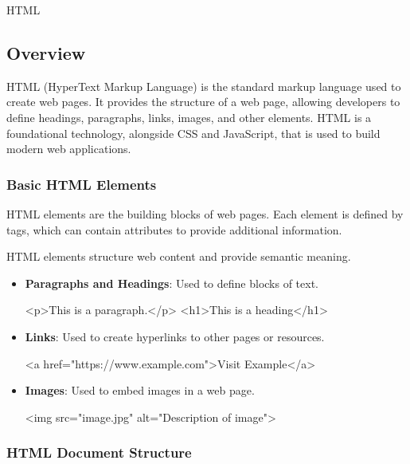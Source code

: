 \begin{notes}{HTML}
    \subsection*{Overview}

    HTML (HyperText Markup Language) is the standard markup language used to create web pages. It provides the structure of a web page, allowing developers to define headings, paragraphs, links, images, 
    and other elements. HTML is a foundational technology, alongside CSS and JavaScript, that is used to build modern web applications.
    
    \subsubsection*{Basic HTML Elements}
    
    HTML elements are the building blocks of web pages. Each element is defined by tags, which can contain attributes to provide additional information.
    
    \begin{highlight}
    
        HTML elements structure web content and provide semantic meaning.
        
        \begin{itemize}
            \item \textbf{Paragraphs and Headings}: Used to define blocks of text.
    \begin{code}[HTML]
    <p>This is a paragraph.</p>
    <h1>This is a heading</h1>
    \end{code}
            \item \textbf{Links}: Used to create hyperlinks to other pages or resources.
    \begin{code}[HTML]
    <a href="https://www.example.com">Visit Example</a>
    \end{code}
            \item \textbf{Images}: Used to embed images in a web page.
    \begin{code}[HTML]
    <img src="image.jpg" alt="Description of image">
    \end{code}
        \end{itemize}
    
    \end{highlight}
    
    \subsubsection*{HTML Document Structure}
    

\end{notes}
